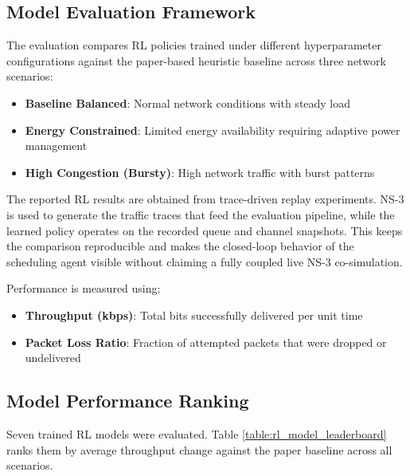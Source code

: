 \subsection{Model Evaluation Framework}

The evaluation compares RL policies trained under different hyperparameter configurations against the paper-based heuristic baseline across three network scenarios:

\begin{itemize}
\item \textbf{Baseline Balanced}: Normal network conditions with steady load
\item \textbf{Energy Constrained}: Limited energy availability requiring adaptive power management
\item \textbf{High Congestion (Bursty)}: High network traffic with burst patterns
\end{itemize}

The reported RL results are obtained from trace-driven replay experiments.
NS-3 is used to generate the traffic traces that feed the evaluation pipeline,
while the learned policy operates on the recorded queue and channel snapshots.
This keeps the comparison reproducible and makes the closed-loop behavior of
the scheduling agent visible without claiming a fully coupled live NS-3
co-simulation.

Performance is measured using:
\begin{itemize}
\item \textbf{Throughput (kbps)}: Total bits successfully delivered per unit time
\item \textbf{Packet Loss Ratio}: Fraction of attempted packets that were dropped or undelivered
\end{itemize}

\subsection{Model Performance Ranking}

Seven trained RL models were evaluated. Table \ref{table:rl_model_leaderboard} ranks them by average throughput change against the paper baseline across all scenarios.

